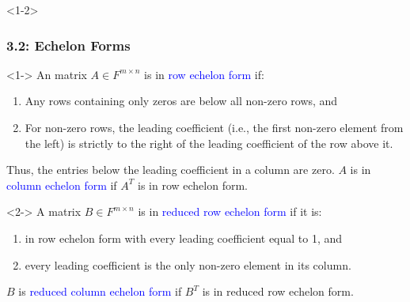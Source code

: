 \documentclass[10pt,english,aspectratio=169]{beamer}
\begin{document}

\begin{frame}<1-2> \frametitle{3.2: Echelon Forms}

\begin{definition}<1->
An matrix $A \in F^{m\times n}$ is in \textcolor{blue}{row echelon form} if:
\begin{enumerate}
\item Any rows containing only zeros are below all non-zero rows, and
\item For non-zero rows, the leading coefficient (i.e., the first non-zero element from the left) is strictly to the right of the leading coefficient of the row above it.
\end{enumerate}
Thus, the entries below the leading coefficient in a column are zero.
$A$ is in \textcolor{blue}{column echelon form} if $A^T$ is in row echelon form.
\end{definition}

\begin{definition}<2->
A matrix $B \in F^{m\times n}$ is in \textcolor{blue}{reduced row echelon form} if it is:
\begin{enumerate}
\item in row echelon form with every leading coefficient equal to 1, and
\item every leading coefficient is the only non-zero element in its column.
\end{enumerate}
$B$ is \textcolor{blue}{reduced column echelon form} if $B^T$ is in reduced row echelon form.
\end{definition}





\end{frame}
\end{document}
